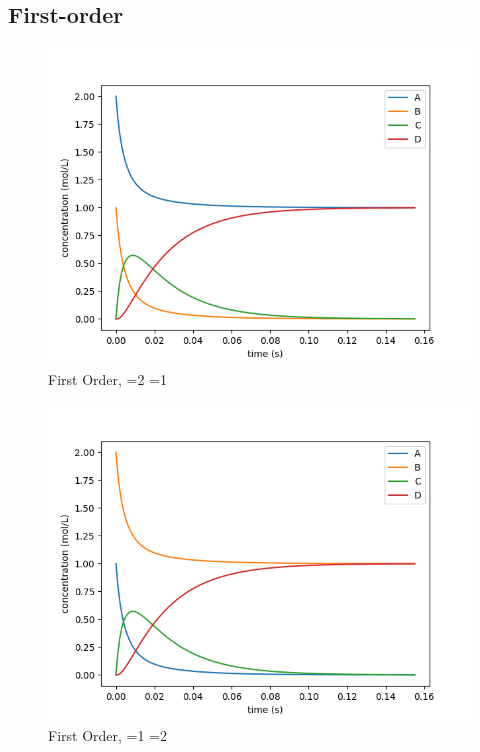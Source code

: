 \documentclass{article}
\begin{document}
\subsection{First-order}
\begin{figure}[H]
\centering
\includegraphics[scale=0.6]{1. first 2 1.png}
\caption{First Order, =2 =1}
\end{figure}
\begin{figure}[H]
\centering
\includegraphics[scale=0.6]{1. first 1 2.png}
\caption{First Order, =1 =2}
\end{figure}
\end{document}
